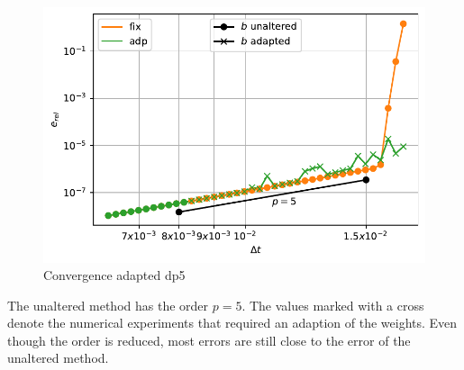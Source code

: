 \documentclass[a4paper]{article}
\numberwithin{equation}{section}
\theoremstyle{plain}
\theoremstyle{definition}
\numberwithin{theorem}{section}
\newcommand{\1}{\mathbbm{1}}
\begin{document}
\begin{figure}[ht]
\centering
\includegraphics[scale=0.75]{plots/conv_adde.pdf}
\caption{Convergence adapted dp5}
\label{fig:conv_expl}
\end{figure}

The unaltered method has the order $p=5$. 
The values marked with a cross denote the numerical experiments that required an adaption of the weights. 
Even though the order is reduced, most errors are still close to the error of the unaltered method.
\end{document}
